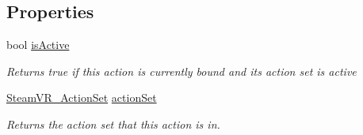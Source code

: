 \subsection*{Properties}
\begin{DoxyCompactItemize}
\item 
bool \mbox{\hyperlink{class_valve_1_1_v_r_1_1_steam_v_r___behaviour___boolean_a893fb4b744621a730be84d41908e0e3a}{is\+Active}}
\begin{DoxyCompactList}\small\item\em Returns true if this action is currently bound and its action set is active \end{DoxyCompactList}\item 
\mbox{\hyperlink{class_valve_1_1_v_r_1_1_steam_v_r___action_set}{Steam\+V\+R\+\_\+\+Action\+Set}} \mbox{\hyperlink{class_valve_1_1_v_r_1_1_steam_v_r___behaviour___boolean_ab6787ffad27bdf7cdf30d0b63c96c8c0}{action\+Set}}
\begin{DoxyCompactList}\small\item\em Returns the action set that this action is in. \end{DoxyCompactList}\end{DoxyCompactItemize}

